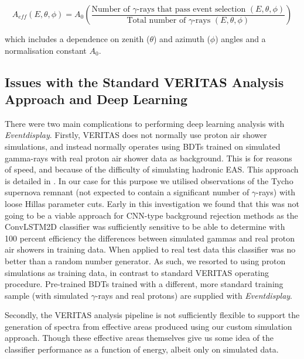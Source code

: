 \begin{equation}
    A_{eff}(E,\theta,\phi)=A_0\left(\frac{\textrm{Number of }\gamma\textrm{-rays that pass event selection }(E,\theta,\phi)}{\textrm{Total number of }\gamma\textrm{-rays }(E,\theta,\phi)}\right)
\end{equation}

which includes a dependence on zenith ($\theta$) and azimuth ($\phi$) angles and a normalisation constant $A_0$. 

\subsection{Issues with the Standard VERITAS Analysis Approach and Deep Learning}
There were two main complications to performing deep learning analysis with \textit{Eventdisplay}. Firstly, VERITAS does not normally use proton air shower simulations, and instead normally operates using BDTs trained on simulated gamma-rays with real proton air shower data as background. This is for reasons of speed, and because of the difficulty of simulating hadronic EAS.  This approach is detailed in \cite{kraus}. In our case for this purpose we utilised observations of the Tycho supernova remnant (not expected to contain a significant number of $\gamma$-rays) with loose Hillas parameter cuts. Early in this investigation we found that this was not going to be a viable approach for CNN-type background rejection methods as the ConvLSTM2D classifier was sufficiently sensitive to be able to determine with 100 percent efficiency the differences between simulated gammas and real proton air showers in training data. When applied to real test data this classifier was no better than a random number generator. As such, we resorted to using proton simulations as training data, in contrast to standard VERITAS operating procedure. Pre-trained BDTs trained with a different, more standard training sample (with simulated $\gamma$-rays and real protons) are supplied with \textit{Eventdisplay}.

Secondly, the VERITAS analysis pipeline is not sufficiently flexible to support the generation of spectra from effective areas produced using our custom simulation approach. Though these effective areas themselves give us some idea of the classifier performance as a function of energy, albeit only on simulated data.

